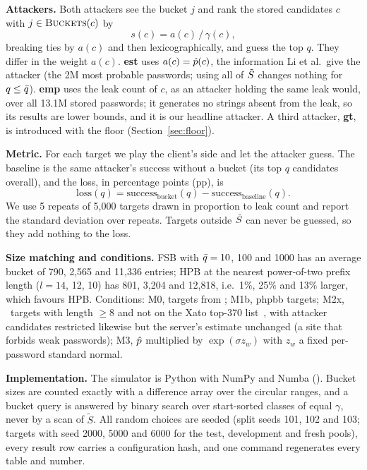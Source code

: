 \textbf{Attackers.} Both attackers see the bucket $j$ and rank the stored candidates $c$ with $j\in\textsc{Buckets}(c)$ by
\begin{equation}\label{eq:score}
s(c)=a(c)\,/\,\gamma(c),
\end{equation}
breaking ties by $a(c)$ and then lexicographically, and guess the top $q$. They differ in the weight $a(c)$. \textbf{est} uses $a(c)=\hat p(c)$, the information Li et al.\ give the attacker (the 2M most probable passwords; using all of $\tilde S$ changes nothing for $q\le\bar q$). \textbf{emp} uses the leak count of $c$, as an attacker holding the same leak would, over all 13.1M stored passwords; it generates no strings absent from the leak, so its results are lower bounds, and it is our headline attacker. A third attacker, \textbf{gt}, is introduced with the floor (Section~\ref{sec:floor}).

\textbf{Metric.} For each target we play the client's side and let the attacker guess. The baseline is the same attacker's success without a bucket (its top $q$ candidates overall), and the loss, in percentage points (pp), is
\begin{equation}\label{eq:loss}
\mathrm{loss}(q)=\mathrm{success}_{\text{bucket}}(q)-\mathrm{success}_{\text{baseline}}(q).
\end{equation}
We use 5 repeats of 5,000 targets drawn in proportion to leak count and report the standard deviation over repeats. Targets outside $\tilde S$ can never be guessed, so they add nothing to the loss.

\textbf{Size matching and conditions.} FSB with $\bar q=10$, 100 and 1000 has an average bucket of 790, 2,565 and 11,336 entries; HPB at the nearest power-of-two prefix length ($l=14$, 12, 10) has 801, 3,204 and 12,818, i.e.\ 1\%, 25\% and 13\% larger, which favours HPB. Conditions: M0, targets from \Atest; M1b, phpbb targets; M2x, \Atest\ targets with length $\ge 8$ and not on the Xato top-370 list~\cite{miessler}, with attacker candidates restricted likewise but the server's estimate unchanged (a site that forbids weak passwords); M3, $\hat p$ multiplied by $\exp(\sigma z_w)$ with $z_w$ a fixed per-password standard normal.

\textbf{Implementation.} The simulator is Python with NumPy and Numba (). Bucket sizes are counted exactly with a difference array over the circular ranges, and a bucket query is answered by binary search over start-sorted classes of equal $\gamma$, never by a scan of $\tilde S$. All random choices are seeded (split seeds 101, 102 and 103; targets with seed 2000, 5000 and 6000 for the test, development and fresh pools), every result row carries a configuration hash, and one command regenerates every table and number.

